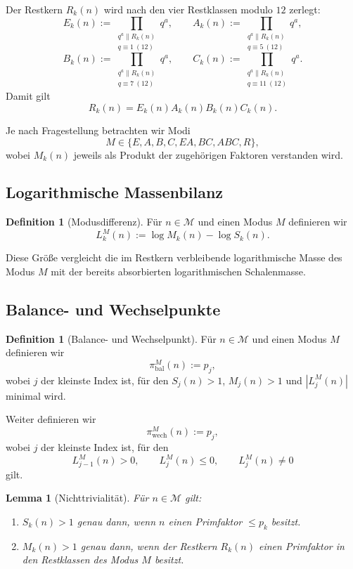 \documentclass[11pt,a4paper]{article}
\theoremstyle{plain}
\newtheorem{lemma}[satz]{Lemma}
\theoremstyle{definition}
\newtheorem{definition}[satz]{Definition}
\theoremstyle{remark}
\newcommand{\M}{\mathcal{M}}
\newcommand{\bal}{\mathrm{bal}}
\newcommand{\wech}{\mathrm{wech}}
\newcommand{\1}{\mathbf{1}}
\begin{document}
	Der Restkern \(R_k(n)\) wird nach den vier Restklassen modulo \(12\) zerlegt:
	\[
	E_k(n):=\prod_{\substack{q^a\parallel R_k(n)\\ q\equiv 1\ (12)}} q^a,\qquad
	A_k(n):=\prod_{\substack{q^a\parallel R_k(n)\\ q\equiv 5\ (12)}} q^a,
	\]
	\[
	B_k(n):=\prod_{\substack{q^a\parallel R_k(n)\\ q\equiv 7\ (12)}} q^a,\qquad
	C_k(n):=\prod_{\substack{q^a\parallel R_k(n)\\ q\equiv 11\ (12)}} q^a.
	\]
	Damit gilt
	\[
	R_k(n)=E_k(n)A_k(n)B_k(n)C_k(n).
	\]
	
	Je nach Fragestellung betrachten wir Modi
	\[
	M\in\{E,A,B,C,EA,BC,ABC,R\},
	\]
	wobei \(M_k(n)\) jeweils als Produkt der zugehörigen Faktoren verstanden wird.
	
	\subsection{Logarithmische Massenbilanz}
	
	\begin{definition}[Modusdifferenz]
		Für \(n\in\M\) und einen Modus \(M\) definieren wir
		\[
		L_k^M(n):=\log M_k(n)-\log S_k(n).
		\]
	\end{definition}
	
	Diese Größe vergleicht die im Restkern verbleibende logarithmische Masse des Modus \(M\) mit der bereits absorbierten logarithmischen Schalenmasse.
	
	\subsection{Balance- und Wechselpunkte}
	
	\begin{definition}[Balance- und Wechselpunkt]
		Für \(n\in\M\) und einen Modus \(M\) definieren wir
		\[
		\pi_{\bal}^M(n):=p_j,
		\]
		wobei \(j\) der kleinste Index ist, für den \(S_j(n)>1\), \(M_j(n)>1\) und \(|L_j^M(n)|\) minimal wird.
		
		Weiter definieren wir
		\[
		\pi_{\wech}^M(n):=p_j,
		\]
		wobei \(j\) der kleinste Index ist, für den
		\[
		L_{j-1}^M(n)>0,\qquad L_j^M(n)\le 0,\qquad L_j^M(n)\neq 0
		\]
		gilt.
	\end{definition}
	
	\begin{lemma}[Nichttrivialität]
		\label{lem:nichttrivial}
		Für \(n\in\M\) gilt:
		\begin{enumerate}[label=(\roman*)]
			\item \(S_k(n)>1\) genau dann, wenn \(n\) einen Primfaktor \(\le p_k\) besitzt.
			\item \(M_k(n)>1\) genau dann, wenn der Restkern \(R_k(n)\) einen Primfaktor in den Restklassen des Modus \(M\) besitzt.
		\end{enumerate}
	\end{lemma}
	
\end{document}
